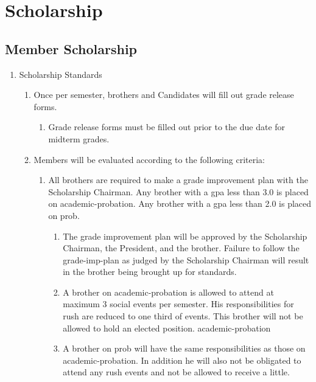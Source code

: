 \chapter{Scholarship}


\section{Member Scholarship}
	\label{member-schol-stds}
	\begin{enumerate}

	\item Scholarship Standards
		\begin{enumerate}
			\item Once per semester, brothers and Candidates will fill out grade release forms.
			\begin{enumerate}
				\item Grade release forms must be filled out prior to the due date for midterm grades.
			\end{enumerate}

			\item Members will be evaluated according to the following criteria:\label{academic-probation}
			\begin{enumerate}
				\item All brothers are required to make a  grade improvement plan with the Scholarship Chairman. Any brother with a  \gls{gpa} less than 3.0 is placed on \gls{academic-probation}. Any brother with a \gls{gpa} less than 2.0 is placed on \gls{prob}.

				\begin{enumerate}
					\item The grade improvement plan will be approved by the Scholarship Chairman, the President, and the brother. Failure to follow the \gls{grade-imp-plan} as judged by the Scholarship Chairman will result in the brother being brought up for standards.
					\label{academic-watch}

					\item A brother on \gls{academic-probation} is allowed to attend at maximum 3 social events per semester. His responsibilities for rush are reduced to one third of events. This brother will not be allowed to hold an elected position. \label{officer-eligibility}
					\gls{academic-probation}

					\item A brother on \gls{prob} will have the same responsibilities as those on \gls{academic-probation}.  In addition he will also not be obligated to attend any rush events and not be allowed to receive a little.
				\end{enumerate}


\end{enumerate}
\end{enumerate}
\end{enumerate}
